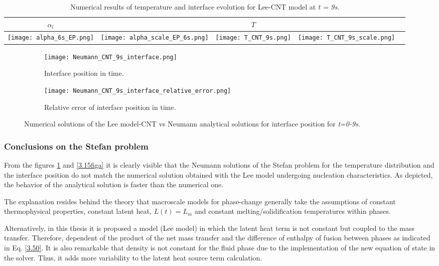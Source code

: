 \begin{table}[h!]
	\begin{tabular}{@{}lllll@{}}
		\toprule[1pt]
		\multicolumn{1}{c}{\textbf{$\alpha_{l}$}}& & \multicolumn{1}{c}{\textbf{$T$}} & \\ \midrule[2pt] 
		\texttt{[image: alpha\_6s\_EP.png]} & \texttt{[image: alpha\_scale\_EP\_6s.png]} & \texttt{[image: T\_CNT\_9s.png]} & \texttt{[image: T\_CNT\_9s\_scale.png]}\\ \bottomrule[1pt]		
	\end{tabular}
	\centering
	\caption{Numerical results of temperature and interface evolution for Lee-CNT model at \textit{t = 9s}.}	
	\label{3.20tab}
\end{table}
\begin{figure}[h!]
	\begin{subfigure}{0.50\textwidth}
		\texttt{[image: Neumann\_CNT\_9s\_interface.png]}\hfill
		\caption{Interface position in time.}\label{3.16figa}
	\end{subfigure}
	\begin{subfigure}{0.50\textwidth}
		\texttt{[image: Neumann\_CNT\_9s\_interface\_relative\_error.png]}	
		\caption{Relative error of interface position in time.}\label{3.16figb}
	\end{subfigure}
	\caption{Numerical solutions of the Lee model-CNT vs Neumann analytical solutions for interface position for \textit{t=0-9s}.}
\label{3.16fig}
\end{figure}

\subsubsection{Conclusions on the Stefan problem}
From the figures \ref{3.16figa} and \ref{3.15figa} it is clearly visible that the Neumann solutions of the Stefan problem for the temperature distribution and the interface position do not match the numerical solution obtained with the Lee model undergoing nucleation characteristics. As depicted, the behavior of the analytical solution is faster than the numerical one. 
 
\noindent The explanation resides behind the theory that macroscale models for phase-change generally take the assumptions of constant thermophysical properties, constant latent heat, $L(t) = L_{m}$ and constant melting/solidification temperatures within phases. 

\noindent Alternatively, in this thesis it is proposed a model (Lee model) in which the latent heat term is not constant but coupled to the mass transfer. Therefore, dependent of the product of the net mass transfer and the difference of enthalpy of fusion between phases as indicated in Eq. \ref{3.50}. It is also remarkable that density is not constant for the fluid phase due to the implementation of the new equation of state in the solver. Thus, it adds more variability to the latent heat source term calculation.

